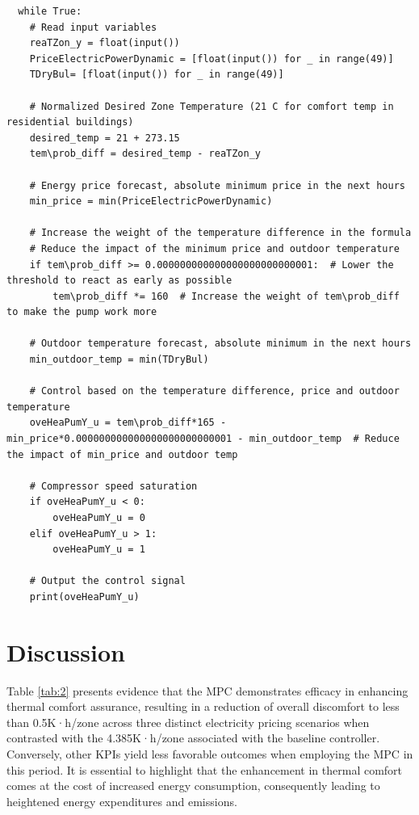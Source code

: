 \begin{lstlisting}
  while True:
    # Read input variables
    reaTZon_y = float(input())
    PriceElectricPowerDynamic = [float(input()) for _ in range(49)]
    TDryBul= [float(input()) for _ in range(49)]

    # Normalized Desired Zone Temperature (21 C for comfort temp in residential buildings)
    desired_temp = 21 + 273.15
    tem\prob_diff = desired_temp - reaTZon_y

    # Energy price forecast, absolute minimum price in the next hours
    min_price = min(PriceElectricPowerDynamic)

    # Increase the weight of the temperature difference in the formula
    # Reduce the impact of the minimum price and outdoor temperature
    if tem\prob_diff >= 0.000000000000000000000000001:  # Lower the threshold to react as early as possible
        tem\prob_diff *= 160  # Increase the weight of tem\prob_diff to make the pump work more

    # Outdoor temperature forecast, absolute minimum in the next hours
    min_outdoor_temp = min(TDryBul)

    # Control based on the temperature difference, price and outdoor temperature
    oveHeaPumY_u = tem\prob_diff*165 - min_price*0.000000000000000000000000001 - min_outdoor_temp  # Reduce the impact of min_price and outdoor temp

    # Compressor speed saturation
    if oveHeaPumY_u < 0:
        oveHeaPumY_u = 0
    elif oveHeaPumY_u > 1:
        oveHeaPumY_u = 1

    # Output the control signal
    print(oveHeaPumY_u)
\end{lstlisting}

\newpage
\section{Discussion}
\label{sec:boptest-discussion}

Table \ref{tab:2} presents evidence that the MPC demonstrates efficacy in enhancing thermal comfort assurance, resulting in a reduction of overall discomfort to less than 0.5K·h/zone across three distinct electricity pricing scenarios when contrasted with the 4.385K·h/zone associated with the baseline controller. Conversely, other KPIs yield less favorable outcomes when employing the MPC in this period. It is essential to highlight that the enhancement in thermal comfort comes at the cost of increased energy consumption, consequently leading to heightened energy expenditures and emissions.


